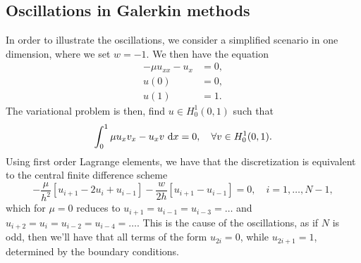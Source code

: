 \subsection{Oscillations in Galerkin methods}
In order to illustrate the oscillations, we consider a simplified scenario in one dimension, where we set $w = -1$.
We then have the equation
\begin{equation}
    \begin{split}
        -\mu u_{xx} - u_x &= 0, \\
        u(0) &= 0, \\
        u(1) &= 1.
    \end{split}
\end{equation}
The variational problem is then, find $u \in H^1_0(0, 1)$ such that
\begin{equation}
    \int_{0}^{1} \mu u_x v_x - u_x v \, \mathop{}\!\mathrm{d} x = 0, \quad \forall v \in H^1_0(0, 1).
\end{equation}
Using first order Lagrange elements, we have that the discretization is equivalent to the central finite difference scheme
\begin{equation}
    -\frac{\mu}{h^2} \left[
        u_{i+1} - 2u_i + u_{i-1}
    \right]
    - \frac{w}{2h} \left[
        u_{i+1} - u_{i-1}
    \right] = 0, \quad i = 1, \ldots, N-1,
\end{equation}
which for $\mu = 0$ reduces to $u_{i + 1} = u_{i - 1} = u_{i - 3} = \ldots$ and $u_{i + 2} = u_i = u_{i - 2} = u_{i - 4} = \ldots$.
This is the cause of the oscillations, as if $N$ is odd, then we'll have that all terms of the form $u_{2i} = 0$, while $u_{2i + 1} = 1$, determined by the boundary conditions.
